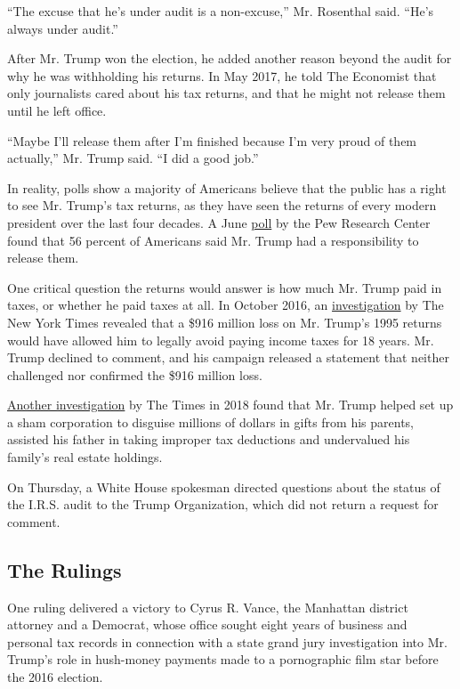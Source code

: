 ``The excuse that he's under audit is a non-excuse,'' Mr. Rosenthal
said. ``He's always under audit.''

After Mr. Trump won the election, he added another reason beyond the
audit for why he was withholding his returns. In May 2017, he told The
Economist that only journalists cared about his tax returns, and that he
might not release them until he left office.

``Maybe I'll release them after I'm finished because I'm very proud of
them actually,'' Mr. Trump said. ``I did a good job.''

In reality, polls show a majority of Americans believe that the public
has a right to see Mr. Trump's tax returns, as they have seen the
returns of every modern president over the last four decades. A June
\href{https://www.pewresearch.org/politics/2020/06/30/publics-mood-turns-grim-trump-trails-biden-on-most-personal-traits-major-issues/}{poll}
by the Pew Research Center found that 56 percent of Americans said Mr.
Trump had a responsibility to release them.

One critical question the returns would answer is how much Mr. Trump
paid in taxes, or whether he paid taxes at all. In October 2016, an
\href{https://www.nytimes.com/2016/10/02/us/politics/donald-trump-taxes.html}{investigation}
by The New York Times revealed that a \$916 million loss on Mr. Trump's
1995 returns would have allowed him to legally avoid paying income taxes
for 18 years. Mr. Trump declined to comment, and his campaign released a
statement that neither challenged nor confirmed the \$916 million loss.

\href{https://www.nytimes.com/interactive/2018/10/02/us/politics/donald-trump-tax-schemes-fred-trump.html}{Another
investigation} by The Times in 2018 found that Mr. Trump helped set up a
sham corporation to disguise millions of dollars in gifts from his
parents, assisted his father in taking improper tax deductions and
undervalued his family's real estate holdings.

On Thursday, a White House spokesman directed questions about the status
of the I.R.S. audit to the Trump Organization, which did not return a
request for comment.

\hypertarget{the-rulings}{%
\subsection{The Rulings}\label{the-rulings}}

One ruling delivered a victory to Cyrus R. Vance, the Manhattan district
attorney and a Democrat, whose office sought eight years of business and
personal tax records in connection with a state grand jury investigation
into Mr. Trump's role in hush-money payments made to a pornographic film
star before the 2016 election.

